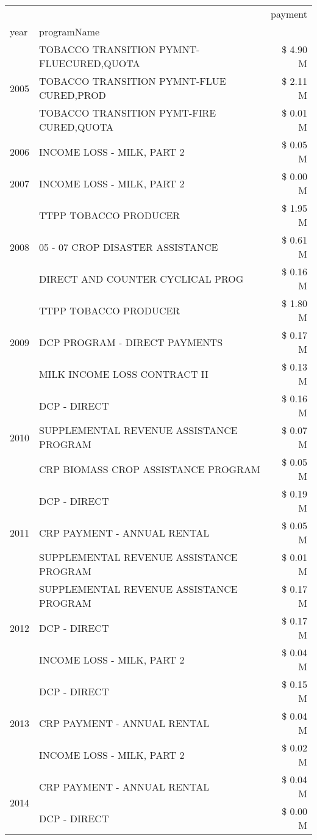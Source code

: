 \begin{tabular}{llr}
\toprule
 &  & payment \\
year & programName &  \\
\midrule
\multirow[t]{3}{*}{2005} & TOBACCO TRANSITION PYMNT-FLUECURED,QUOTA & \$ 4.90 M \\
 & TOBACCO TRANSITION PYMNT-FLUE CURED,PROD & \$ 2.11 M \\
 & TOBACCO TRANSITION PYMT-FIRE CURED,QUOTA & \$ 0.01 M \\
\cline{1-3}
2006 & INCOME LOSS - MILK, PART 2 & \$ 0.05 M \\
\cline{1-3}
2007 & INCOME LOSS - MILK, PART 2 & \$ 0.00 M \\
\cline{1-3}
\multirow[t]{3}{*}{2008} & TTPP TOBACCO PRODUCER & \$ 1.95 M \\
 & 05 - 07 CROP DISASTER ASSISTANCE & \$ 0.61 M \\
 & DIRECT AND COUNTER CYCLICAL PROG & \$ 0.16 M \\
\cline{1-3}
\multirow[t]{3}{*}{2009} & TTPP TOBACCO PRODUCER & \$ 1.80 M \\
 & DCP PROGRAM - DIRECT PAYMENTS & \$ 0.17 M \\
 & MILK INCOME LOSS CONTRACT II & \$ 0.13 M \\
\cline{1-3}
\multirow[t]{3}{*}{2010} & DCP - DIRECT & \$ 0.16 M \\
 & SUPPLEMENTAL REVENUE ASSISTANCE PROGRAM & \$ 0.07 M \\
 & CRP BIOMASS CROP ASSISTANCE PROGRAM & \$ 0.05 M \\
\cline{1-3}
\multirow[t]{3}{*}{2011} & DCP - DIRECT & \$ 0.19 M \\
 & CRP PAYMENT - ANNUAL RENTAL & \$ 0.05 M \\
 & SUPPLEMENTAL REVENUE ASSISTANCE PROGRAM & \$ 0.01 M \\
\cline{1-3}
\multirow[t]{3}{*}{2012} & SUPPLEMENTAL REVENUE ASSISTANCE PROGRAM & \$ 0.17 M \\
 & DCP - DIRECT & \$ 0.17 M \\
 & INCOME LOSS - MILK, PART 2 & \$ 0.04 M \\
\cline{1-3}
\multirow[t]{3}{*}{2013} & DCP - DIRECT & \$ 0.15 M \\
 & CRP PAYMENT - ANNUAL RENTAL & \$ 0.04 M \\
 & INCOME LOSS - MILK, PART 2 & \$ 0.02 M \\
\cline{1-3}
\multirow[t]{2}{*}{2014} & CRP PAYMENT - ANNUAL RENTAL & \$ 0.04 M \\
 & DCP - DIRECT & \$ 0.00 M \\

\end{tabular}
